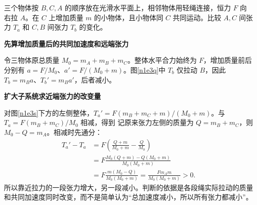 \begin{question}\begin{example}[增加中间物体质量后的张力]\label{n1e3}
三个物体按 $B,C,A$ 的顺序放在光滑水平面上，相邻物体用轻绳连接，恒力 $F$ 向右拉 $A$。在 $C$ 上增加质量 $m$ 的小物体，且小物体同 $C$ 共同运动。比较 $A,C$ 间张力 $T_a$ 和 $C,B$ 间张力 $T_b$ 的变化。
\end{example}\end{question}
\begin{solution}\textbf{先算增加质量后的共同加速度和远端张力}\par\nobreak
令三物体原总质量 $M_0=m_A+m_B+m_C$。整体水平合力始终为 $F$，增加质量前后分别有 $a=F/M_0$、$a'=F/(M_0+m)$。图\ref{n1e3q}中 $T_b$ 仅拉动 $B$，因此 $T_b=m_Ba$、$T_b'=m_Ba'$，后者减小。


\par\medskip{}\noindent\textbf{扩大子系统求近端张力的改变量}\par\nobreak
对图\ref{n1e3s}下方的左侧整体，$T_a'=F(m_B+m_C+m)/(M_0+m)$。与 $T_a=F(m_B+m_C)/M_0$ 相减，得到
记原来张力左侧的质量为 $Q=m_B+m_C$，则 $M_0-Q=m_A$。相减时先通分：
\begin{align*}
 T_a'-T_a&=F\left(\frac{Q+m}{M_0+m}-\frac{Q}{M_0}\right)\\
 &=F\frac{M_0(Q+m)-Q(M_0+m)}{M_0(M_0+m)}\\
 &=F\frac{m(M_0-Q)}{M_0(M_0+m)}
 =\frac{Fm_Am}{M_0(M_0+m)}>0.
\end{align*}
所以靠近拉力的一段张力增大，另一段减小。判断的依据是各段绳实际拉动的质量和共同加速度同时改变，而不是简单认为“总加速度减小，所以所有张力都减小”。
\end{solution}

